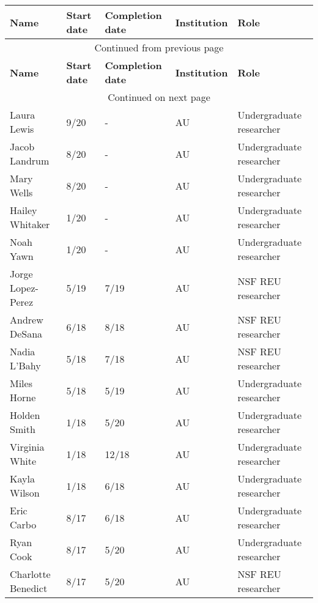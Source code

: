 {\sffamily\small
{}
\begin{longtable}[l]{ p{1.2in} p{0.5in} p{0.8in}p{0.75in} p{2in} }
    \hline
    \textbf{Name} & \textbf{Start date} & \textbf{Completion date} & \textbf{Institution} & \textbf{Role} \\
    \hline
    \endfirsthead
    \multicolumn{5}{c}{{Continued from previous page}} \\
    \hline
    \textbf{Name} & \textbf{Start date} & \textbf{Completion date} & \textbf{Institution} & \textbf{Role} \\
    \hline
    \endhead
    \hline \multicolumn{5}{c}{{Continued on next page}} \\
    \endfoot
    \hline
    \endlastfoot
    Laura Lewis & 9/20 & - & AU & Undergraduate researcher \\
    Jacob Landrum & 8/20 & - & AU & Undergraduate researcher \\
    Mary Wells & 8/20 & - & AU & Undergraduate researcher \\
    Hailey Whitaker & 1/20 & - & AU & Undergraduate researcher \\
    Noah Yawn & 1/20 & - & AU & Undergraduate researcher \\
    Jorge Lopez-Perez & 5/19 & 7/19 & AU & NSF REU researcher \\
    Andrew DeSana & 6/18 & 8/18 & AU & NSF REU researcher \\
    Nadia L'Bahy & 5/18 & 7/18 & AU & NSF REU researcher \\
    Miles Horne & 5/18 & 5/19 & AU & Undergraduate researcher \\
    Holden Smith & 1/18 & 5/20 & AU & Undergraduate researcher \\
    Virginia White & 1/18 & 12/18 & AU & Undergraduate researcher \\
    Kayla Wilson & 1/18 & 6/18 & AU & Undergraduate researcher \\
    Eric Carbo & 8/17 & 6/18 & AU & Undergraduate researcher \\
    Ryan Cook & 8/17 & 5/20 & AU & Undergraduate researcher \\
    Charlotte Benedict & 8/17 & 5/20 & AU & NSF REU researcher \\
\end{longtable}
}
